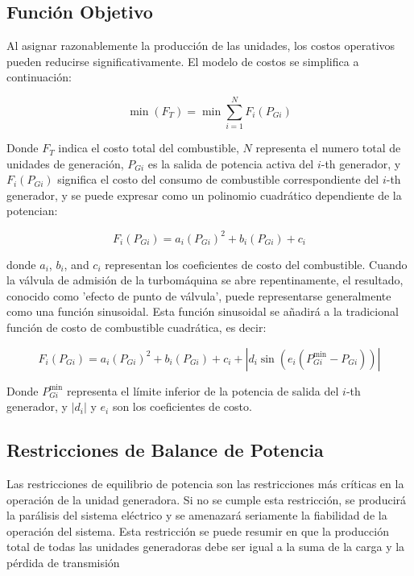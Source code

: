 \documentclass[11pt]{article}
\begin{document}
\subsection{Función Objetivo}

Al asignar razonablemente la producción de las unidades, los costos operativos pueden reducirse significativamente. 
El modelo de costos se simplifica a continuación:

\begin{equation}
    \min (F_T) =\min  \sum_{i=1}^{N} F_i(P_{Gi})
\end{equation}

Donde \( F_T \) indica el costo total del combustible, \( N \) representa el numero total de unidades de generación, 
\( P_{Gi} \) es la salida de potencia activa del \( i \)-th generador, y \( F_i(P_{Gi}) \) significa el costo del consumo 
de combustible correspondiente del \( i \)-th generador, y se puede expresar como un polinomio cuadrático dependiente de 
la potencian:

\begin{equation}
    F_i(P_{Gi}) = a_i(P_{Gi})^2 + b_i(P_{Gi}) + c_i
\end{equation}

donde \( a_i \), \( b_i \), and \( c_i \) representan los coeficientes de costo del combustible. Cuando la válvula de 
admisión de la turbomáquina se abre repentinamente, el resultado, conocido como 'efecto de punto de válvula', 
puede representarse generalmente como una función sinusoidal. Esta función sinusoidal se añadirá a la tradicional 
función de costo de combustible cuadrática, es decir:

\begin{equation}
    F_i(P_{Gi}) = a_i(P_{Gi})^2 + b_i(P_{Gi}) + c_i + |d_i \sin(e_i (P_{Gi}^{\min} - P_{Gi}))|
\end{equation}

Donde \( P_{Gi}^{\min} \) representa el límite inferior de la potencia de salida del \( i \)-th generador, 
y \( |d_i| \) y \( e_i \) son los coeficientes de costo. 

\subsection{Restricciones de Balance de Potencia}
Las restricciones de equilibrio de potencia son las restricciones más críticas en la operación de la unidad generadora. 
Si no se cumple esta restricción, se producirá la parálisis del sistema eléctrico y se amenazará seriamente la fiabilidad
 de la operación del sistema. Esta restricción se puede resumir en que la producción total de todas las unidades generadoras 
 debe ser igual a la suma de la carga y la pérdida de transmisión
\end{document}
